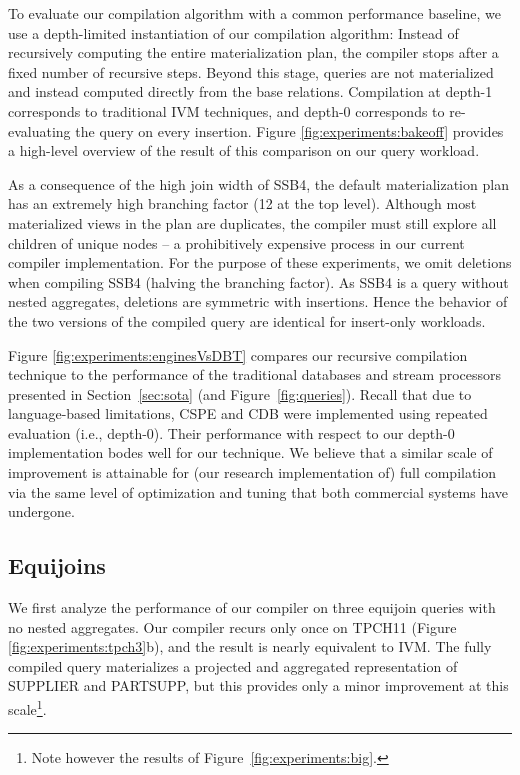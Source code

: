 To evaluate our compilation algorithm with a common performance baseline, we use a depth-limited instantiation of our compilation algorithm: Instead of recursively computing the entire materialization plan, the compiler stops after a fixed number of recursive steps.  Beyond this stage, queries are not materialized and instead computed directly from the base relations.   Compilation at depth-1 corresponds to traditional IVM techniques, and depth-0 corresponds to re-evaluating the query on every insertion.  Figure \ref{fig:experiments:bakeoff} provides a high-level overview of the result of this comparison on our query workload.

As a consequence of the high join width of SSB4, the default materialization plan has an extremely high branching factor (12 at the top level).  Although most materialized views in the plan are duplicates, the compiler must still explore all children of unique nodes -- a prohibitively expensive process in our current compiler implementation.  For the purpose of these experiments, we omit deletions when compiling SSB4 (halving the branching factor).  As SSB4 is a query without nested aggregates, deletions are symmetric with insertions.  Hence the behavior of the two versions of the compiled query are identical for insert-only workloads.

Figure \ref{fig:experiments:enginesVsDBT} compares our recursive compilation technique to the performance of the traditional databases and stream processors presented in Section~\ref{sec:sota} (and Figure~\ref{fig:queries}).  Recall that due to language-based limitations, CSPE and CDB were implemented using repeated evaluation (i.e., depth-0).  Their performance with respect to our depth-0 implementation bodes well for our technique.  We believe that a similar scale of improvement is attainable for (our research implementation of) full compilation via the same level of optimization and tuning that both commercial systems have undergone.

\subsection{Equijoins}

We first analyze the performance of our compiler on three equijoin queries with no nested aggregates.  Our compiler recurs only once on TPCH11 (Figure \ref{fig:experiments:tpch3}b), and the result is nearly equivalent to IVM.  The fully compiled query materializes a projected and aggregated representation of SUPPLIER and PARTSUPP, but this provides only a minor improvement at this scale\footnote{Note however the results of Figure~\ref{fig:experiments:big}.}.  

